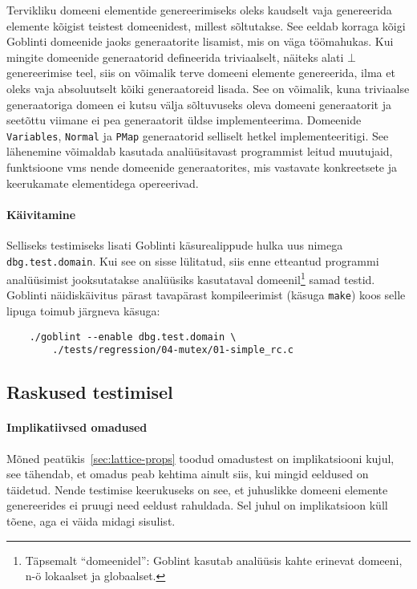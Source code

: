 \documentclass[../thesis.tex]{subfiles}
\begin{document}
Tervikliku domeeni elementide genereerimiseks oleks kaudselt vaja genereerida elemente kõigist teistest domeenidest, millest sõltutakse. See eeldab korraga kõigi Goblinti domeenide jaoks generaatorite lisamist, mis on väga töömahukas. Kui mingite domeenide generaatorid defineerida triviaalselt, näiteks alati $\bot$ genereerimise teel, siis on võimalik terve domeeni elemente genereerida, ilma et oleks vaja absoluutselt kõiki generaatoreid lisada. See on võimalik, kuna triviaalse generaatoriga domeen ei kutsu välja sõltuvuseks oleva domeeni generaatorit ja seetõttu viimane ei pea generaatorit üldse implementeerima. Domeenide \texttt{Variables}, \texttt{Normal} ja \texttt{PMap} generaatorid selliselt hetkel implementeeritigi.
See lähenemine võimaldab kasutada analüüsitavast programmist leitud muutujaid, funktsioone vms nende domeenide generaatorites, mis vastavate konkreetsete ja keerukamate elementidega opereerivad.

\paragraph{Käivitamine}
Selliseks testimiseks lisati Goblinti käsurealippude hulka uus nimega \texttt{dbg.test.domain}. Kui see on sisse lülitatud, siis enne etteantud programmi analüüsimist jooksutatakse analüüsiks kasutataval domeenil\footnote{Täpsemalt \enquote{domeenidel}: Goblint kasutab analüüsis kahte erinevat domeeni, n-ö lokaalset ja globaalset.} samad testid. Goblinti näidiskäivitus pärast tavapärast kompileerimist (käsuga \texttt{make}) koos selle lipuga toimub järgneva käsuga:
\begin{verbatim}
	./goblint --enable dbg.test.domain \
	    ./tests/regression/04-mutex/01-simple_rc.c
\end{verbatim}

\subsection{Raskused testimisel}
\paragraph{Implikatiivsed omadused}
Mõned peatükis~\ref{sec:lattice-props} toodud omadustest on implikatsiooni kujul, see tähendab, et omadus peab kehtima ainult siis, kui mingid eeldused on täidetud. Nende testimise keerukuseks on see, et juhuslikke domeeni elemente genereerides ei pruugi need eeldust rahuldada. Sel juhul on implikatsioon küll tõene, aga ei väida midagi sisulist.
\end{document}
